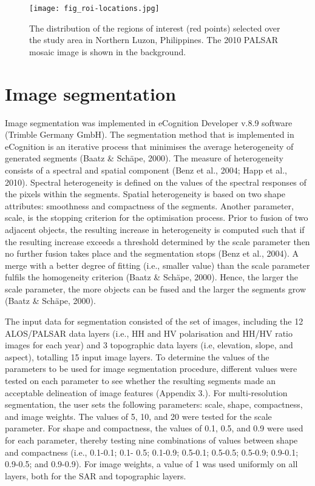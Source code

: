 \begin{figure}
	\centering
	\texttt{[image: fig\_roi-locations.jpg]}
	\caption[The distribution of the regions of interest selected over the study area in Northern Luzon, Philippines.]{The distribution of the regions of interest (red points) selected over the study area in Northern Luzon, Philippines. The 2010 PALSAR mosaic image is shown in the background.}
	\label{fig: method-fig3.5}
\end{figure}

\section{Image segmentation}
\label{sec: method-segmentation}

Image segmentation was implemented in eCognition Developer v.8.9 software (Trimble Germany GmbH). The segmentation method that is implemented in eCognition is an iterative process that minimises the average heterogeneity of generated segments (Baatz \& Schäpe, 2000). The measure of heterogeneity consists of a spectral and spatial component (Benz et al., 2004; Happ et al., 2010). Spectral heterogeneity is defined on the values of the spectral responses of the pixels within the segments. Spatial heterogeneity is based on two shape attributes: smoothness and compactness of the segments. Another parameter, scale, is the stopping criterion for the optimisation process. Prior to fusion of two adjacent objects, the resulting increase in heterogeneity is computed such that if the resulting increase exceeds a threshold determined by the scale parameter then no further fusion takes place and the segmentation stops (Benz et al., 2004). A merge with a better degree of fitting (i.e., smaller value) than the scale parameter fulfils the homogeneity criterion (Baatz \& Schäpe, 2000). Hence, the larger the scale parameter, the more objects can be fused and the larger the segments grow (Baatz \& Schäpe, 2000).

The input data for segmentation consisted of the set of images, including the 12 ALOS/PALSAR data layers (i.e., HH and HV polarisation and HH/HV ratio images for each year) and 3 topographic data layers (i.e, elevation, slope, and aspect), totalling 15 input image layers. To determine the values of the parameters to be used for image segmentation procedure, different values were tested on each parameter to see whether the resulting segments made an acceptable delineation of image features (Appendix 3.). For multi-resolution segmentation, the user sets the following parameters: scale, shape, compactness, and image weights. The values of 5, 10, and 20 were tested for the scale parameter. For shape and compactness, the values of 0.1, 0.5, and 0.9 were used for each parameter, thereby testing nine combinations of values between shape and compactness (i.e., 0.1-0.1; 0.1- 0.5; 0.1-0.9; 0.5-0.1; 0.5-0.5; 0.5-0.9; 0.9-0.1; 0.9-0.5; and 0.9-0.9). For image weights, a value of 1 was used uniformly on all layers, both for the SAR and topographic layers.

